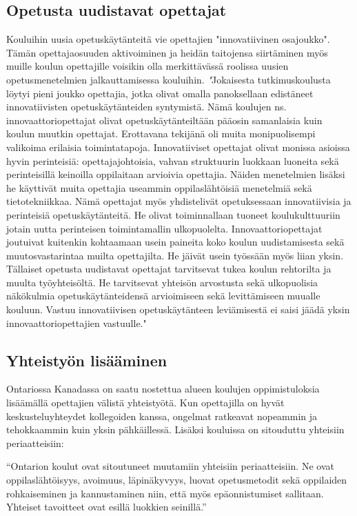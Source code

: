 \documentclass[utf8,bachelor]{gradu3}
\begin{document}
\subsection{Opetusta uudistavat opettajat}
Kouluihin uusia opetuskäytänteitä vie opettajien "innovatiivinen osajoukko". Tämän opettajaosuuden aktivoiminen ja heidän taitojensa siirtäminen myös muille koulun opettajille voisikin olla merkittävässä roolissa uusien opetusmenetelmien jalkauttamisessa kouluihin.
\textit "Jokaisesta tutkimuskoulusta löytyi pieni joukko opettajia, jotka olivat omalla panoksellaan edistäneet innovatiivisten opetuskäytänteiden syntymistä. Nämä koulujen ns. innovaattoriopettajat olivat opetuskäytänteiltään pääosin samanlaisia kuin koulun muutkin opettajat. Erottavana tekijänä oli muita monipuolisempi valikoima erilaisia toimintatapoja. Innovatiiviset opettajat olivat monissa asioissa hyvin perinteisiä: opettajajohtoisia, vahvan struktuurin luokkaan luoneita sekä perinteisillä keinoilla oppilaitaan arvioivia opettajia. Näiden menetelmien lisäksi he käyttivät muita opettajia useammin oppilaslähtöisiä menetelmiä sekä tietotekniikkaa. Nämä opettajat myös yhdistelivät opetuksessaan innovatiivisia ja perinteisiä opetuskäytänteitä. He olivat toiminnallaan tuoneet koulukulttuuriin jotain uutta perinteisen toimintamallin ulkopuolelta. Innovaattoriopettajat joutuivat kuitenkin kohtaamaan usein paineita koko koulun uudistamisesta sekä muutosvastarintaa muilta opettajilta. He jäivät usein työssään myös liian yksin. Tällaiset opetusta uudistavat opettajat tarvitsevat tukea koulun rehtorilta ja muulta työyhteisöltä. He tarvitsevat yhteisön arvostusta sekä ulkopuolisia näkökulmia opetuskäytänteidensä arvioimiseen sekä levittämiseen muualle kouluun. Vastuu innovatiivisen opetuskäytänteen leviämisestä ei saisi jäädä yksin innovaattoriopettajien vastuulle." \parencite[][]{koulunArki}

\subsection{Yhteistyön lisääminen}
Ontariossa Kanadassa on saatu nostettua alueen koulujen oppimistuloksia lisäämällä opettajien välistä yhteistyötä. Kun opettajilla on hyvät keskusteluyhteydet kollegoiden kanssa, ongelmat ratkeavat nopeammin ja tehokkaammin kuin yksin pähkäillessä. Lisäksi kouluissa on sitouduttu yhteisiin periaatteisiin:

“Ontarion koulut ovat sitoutuneet muutamiin yhteisiin periaatteisiin. Ne ovat oppilaslähtöisyys, avoimuus, läpinäkyvyys, luovat opetusmetodit sekä oppilaiden rohkaiseminen ja kannustaminen niin, että myös epäonnistumiset sallitaan. Yhteiset tavoitteet ovat esillä luokkien seinillä.” \parencite[][]{KanadanMalli} 
\end{document}
